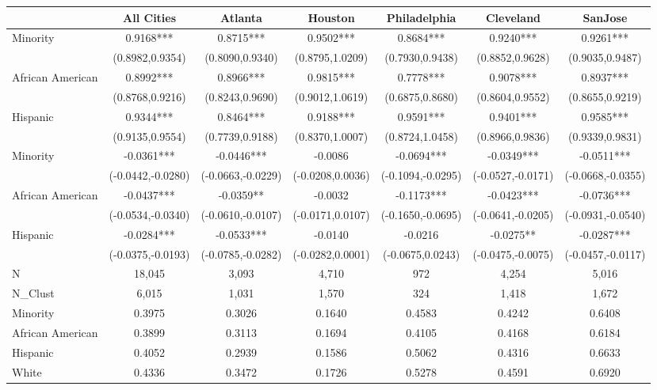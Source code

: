 \begin{tabular}{lcccccc}
\hline  & All Cities & Atlanta & Houston & Philadelphia & Cleveland & SanJose\\
\hline Minority & 0.9168*** & 0.8715*** & 0.9502*** & 0.8684*** & 0.9240*** & 0.9261***\\
 & (0.8982,0.9354) & (0.8090,0.9340) & (0.8795,1.0209) & (0.7930,0.9438) & (0.8852,0.9628) & (0.9035,0.9487)\\
African American & 0.8992*** & 0.8966*** & 0.9815*** & 0.7778*** & 0.9078*** & 0.8937***\\
 & (0.8768,0.9216) & (0.8243,0.9690) & (0.9012,1.0619) & (0.6875,0.8680) & (0.8604,0.9552) & (0.8655,0.9219)\\
Hispanic & 0.9344*** & 0.8464*** & 0.9188*** & 0.9591*** & 0.9401*** & 0.9585***\\
 & (0.9135,0.9554) & (0.7739,0.9188) & (0.8370,1.0007) & (0.8724,1.0458) & (0.8966,0.9836) & (0.9339,0.9831)\\
Minority & -0.0361*** & -0.0446*** & -0.0086 & -0.0694*** & -0.0349*** & -0.0511***\\
 & (-0.0442,-0.0280) & (-0.0663,-0.0229) & (-0.0208,0.0036) & (-0.1094,-0.0295) & (-0.0527,-0.0171) & (-0.0668,-0.0355)\\
African American & -0.0437*** & -0.0359** & -0.0032 & -0.1173*** & -0.0423*** & -0.0736***\\
 & (-0.0534,-0.0340) & (-0.0610,-0.0107) & (-0.0171,0.0107) & (-0.1650,-0.0695) & (-0.0641,-0.0205) & (-0.0931,-0.0540)\\
Hispanic & -0.0284*** & -0.0533*** & -0.0140 & -0.0216 & -0.0275** & -0.0287***\\
 & (-0.0375,-0.0193) & (-0.0785,-0.0282) & (-0.0282,0.0001) & (-0.0675,0.0243) & (-0.0475,-0.0075) & (-0.0457,-0.0117)\\
N & 18,045 & 3,093 & 4,710 & 972 & 4,254 & 5,016\\
N\_Clust & 6,015 & 1,031 & 1,570 & 324 & 1,418 & 1,672\\
Minority & 0.3975 & 0.3026 & 0.1640 & 0.4583 & 0.4242 & 0.6408\\
African American & 0.3899 & 0.3113 & 0.1694 & 0.4105 & 0.4168 & 0.6184\\
Hispanic & 0.4052 & 0.2939 & 0.1586 & 0.5062 & 0.4316 & 0.6633\\
White & 0.4336 & 0.3472 & 0.1726 & 0.5278 & 0.4591 & 0.6920\\
\hline\end{tabular}\\
\hfil\\
